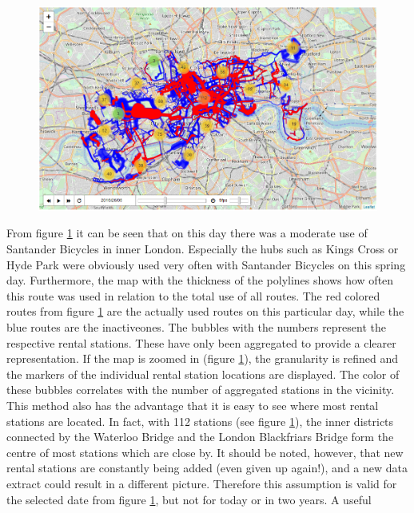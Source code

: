 \begin{figure}[H]
\hspace{-1.6cm}
\includegraphics[width=1.2\textwidth]{img/figure4_folium_plot1}\label{fig:figure4_folium_plot1}
\label{fig:figure4_folium_plot1}
\end{figure}
From figure \ref{fig:figure4_folium_plot1} it can be seen that on this day there was a moderate use of Santander Bicycles in
inner London. Especially the hubs such as Kings Cross or Hyde Park were obviously used very
often with Santander Bicycles on this spring day. Furthermore, the map with the thickness of the
polylines shows how often this route was used in relation to the total use of all routes. The red
colored routes from figure \ref{fig:figure4_folium_plot1} are the actually used routes on this particular day, while the blue
routes are the \glqq inactive\grqq ones. The bubbles with the numbers represent the respective rental
stations. These have only been aggregated to provide a clearer representation. If the map is
zoomed in (figure \ref{fig:figure4_folium_plot1}), the granularity is refined and the markers of the individual rental station
locations are displayed. The color of these bubbles correlates with the number of aggregated
stations in the vicinity. This method also has the advantage that it is easy to see where most rental
stations are located. In fact, with 112 stations (see figure \ref{fig:figure4_folium_plot1}), the inner districts connected by the
Waterloo Bridge and the London Blackfriars Bridge form the centre of most stations which are
close by. It should be noted, however, that new rental stations are constantly being added (even
given up again!), and a new data extract could result in a different picture. Therefore this assumption is valid for the selected date from figure \ref{fig:figure4_folium_plot1}, but not for today or in two years. A useful
